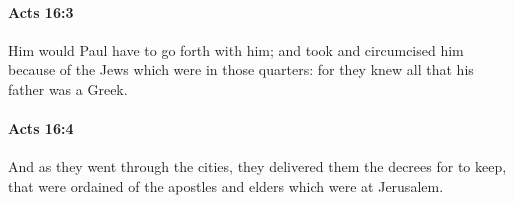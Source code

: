 		\paragraph{Acts 16:3} %
			\label{ACTS-16-3}

			Him would Paul have to go forth with him; and took and circumcised him because of the Jews which were in those quarters: for they knew all that his father was a Greek.

			\begin{framed}
			\scriptsize
				\begin{compactdesc}
					\item[SBLG] 
				\end{compactdesc}
			\end{framed}

		\paragraph{Acts 16:4} %
			\label{ACTS-16-4}

			And as they went through the cities, they delivered them the decrees for to keep, that were ordained of the apostles and elders which were at Jerusalem.

